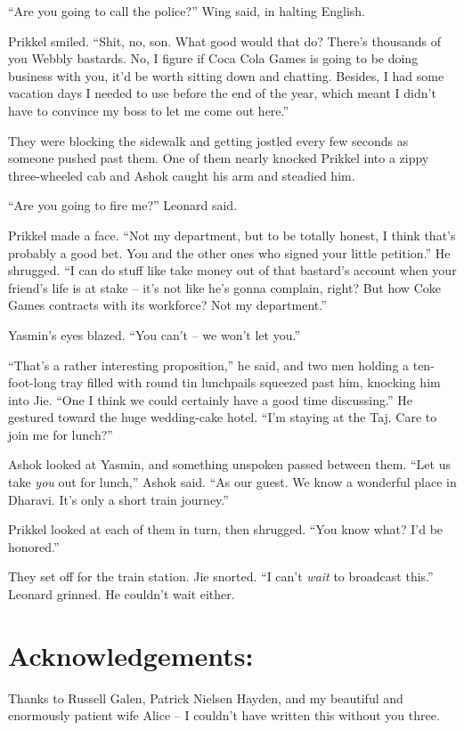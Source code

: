 ``Are you going to call the police?'' Wing said, in halting English.

Prikkel smiled. ``Shit, no, son. What good would that do? There's
thousands of you Webbly bastards. No, I figure if Coca Cola Games
is going to be doing business with you, it'd be worth sitting down
and chatting. Besides, I had some vacation days I needed to use
before the end of the year, which meant I didn't have to convince
my boss to let me come out here.''

They were blocking the sidewalk and getting jostled every few
seconds as someone pushed past them. One of them nearly knocked
Prikkel into a zippy three-wheeled cab and Ashok caught his arm and
steadied him.

``Are you going to fire me?'' Leonard said.

Prikkel made a face. ``Not my department, but to be totally honest,
I think that's probably a good bet. You and the other ones who
signed your little petition.'' He shrugged. ``I can do stuff like
take money out of that bastard's account when your friend's life is
at stake -- it's not like he's gonna complain, right? But how Coke
Games contracts with its workforce? Not my department.''

Yasmin's eyes blazed. ``You can't -- we won't let you.''

``That's a rather interesting proposition,'' he said, and two men
holding a ten-foot-long tray filled with round tin lunchpails
squeezed past him, knocking him into Jie. ``One I think we could
certainly have a good time discussing.'' He gestured toward the huge
wedding-cake hotel. ``I'm staying at the Taj. Care to join me for
lunch?''

Ashok looked at Yasmin, and something unspoken passed between them.
``Let us take \emph{you} out for lunch,'' Ashok said. ``As our guest.
We know a wonderful place in Dharavi. It's only a short train
journey.''

Prikkel looked at each of them in turn, then shrugged. ``You know
what? I'd be honored.''

They set off for the train station. Jie snorted. ``I can't
\emph{wait} to broadcast this.'' Leonard grinned. He couldn't wait
either.

\backmatter

\section{Acknowledgements:}

Thanks to Russell Galen, Patrick Nielsen Hayden, and my beautiful
and enormously patient wife Alice -- I couldn't have written this
without you three.

